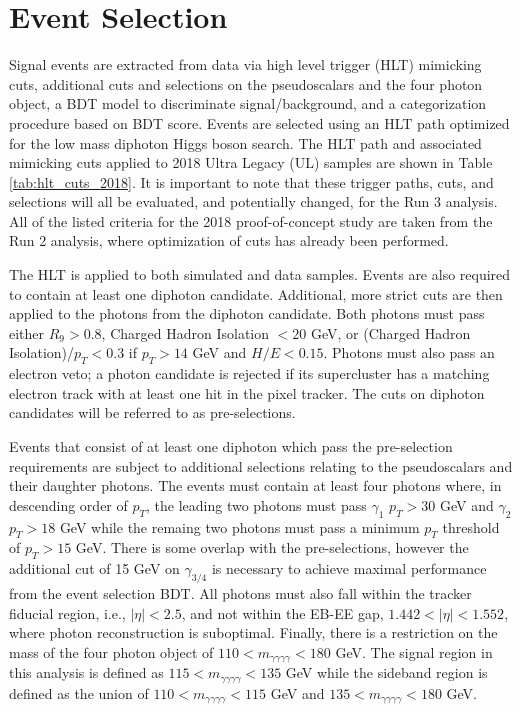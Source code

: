 \documentclass[12pt]{article}
\begin{document}
\section{Event Selection}
Signal events are extracted from data via high level trigger (HLT) mimicking cuts, additional cuts and selections on the pseudoscalars and the four photon object, a BDT model to discriminate signal/background, and a categorization procedure based on BDT score. Events are selected using an HLT path optimized for the low mass diphoton Higgs boson search. The HLT path and associated mimicking cuts applied to 2018 Ultra Legacy (UL) samples are shown in Table \ref{tab:hlt_cuts_2018}. It is important to note that these trigger paths, cuts, and selections will all be evaluated, and potentially changed, for the Run 3 analysis. All of the listed criteria for the 2018 proof-of-concept study are taken from the Run 2 analysis, where optimization of cuts has already been performed.\par

The HLT is applied to both simulated and data samples. Events are also required to contain at least one diphoton candidate. Additional, more strict cuts are then applied to the photons from the diphoton candidate. Both photons must pass either $R_9 > 0.8$, Charged Hadron Isolation $<20$ GeV, or (Charged Hadron Isolation)/$p_T < 0.3$ if $p_T > 14$ GeV and $H/E < 0.15$. Photons must also pass an electron veto; a photon candidate is rejected if its supercluster has a matching electron track with at least one hit in the pixel tracker. The cuts on diphoton candidates will be referred to as pre-selections.\par

Events that consist of at least one diphoton which pass the pre-selection requirements are subject to additional selections relating to the pseudoscalars and their daughter photons. The events must contain at least four photons where, in descending order of $p_T$, the leading two photons must pass $\gamma_1$ $p_T > 30$ GeV and $\gamma_2$ $p_T > 18$ GeV while the remaing two photons must pass a minimum $p_T$ threshold of $p_{T} > 15$ GeV. There is some overlap with the pre-selections, however the additional cut of 15 GeV on $\gamma_{3/4}$ is necessary to achieve maximal performance from the event selection BDT. All photons must also fall within the tracker fiducial region, i.e., $|\eta| < 2.5$, and not within the EB-EE gap, $1.442 < |\eta| < 1.552$, where photon reconstruction is suboptimal. Finally, there is a restriction on the mass of the four photon object of $110 < m_{\gamma \gamma \gamma \gamma} < 180$ GeV. The signal region in this analysis is defined as $115 < m_{\gamma \gamma \gamma \gamma} < 135$ GeV while the sideband region is defined as the union of $110 < m_{\gamma \gamma \gamma \gamma} < 115$ GeV and $135 < m_{\gamma \gamma \gamma \gamma} < 180$ GeV.
\end{document}
